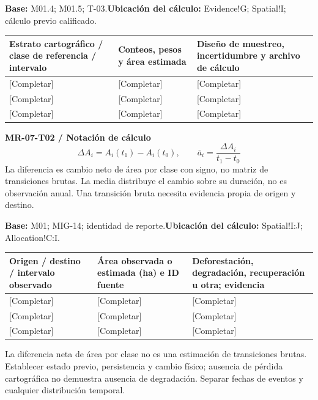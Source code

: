 \textbf{Base:} M01.4; M01.5; T-03.\quad\textbf{Ubicación del cálculo:} Evidence!G; Spatial!I; cálculo previo calificado.\par\endgroup
{\sffamily\fontsize{8.6}{10.7}\selectfont\begin{longtable}{@{}P{48mm}P{61mm}P{53mm}@{}}
\toprule
\textbf{Estrato cartográfico / clase de referencia / intervalo} & \textbf{Conteos, pesos y área estimada} & \textbf{Diseño de muestreo, incertidumbre y archivo de cálculo}\\\midrule\endhead
\rule{0pt}{8mm}[Completar] & [Completar] & [Completar]\\\hline
\rule{0pt}{8mm}[Completar] & [Completar] & [Completar]\\\hline
\rule{0pt}{8mm}[Completar] & [Completar] & [Completar]\\\hline
\end{longtable}}
\par\begingroup\sffamily\fontsize{8.4}{10.5}\selectfont\color{NEBGreen}
\textbf{MR-07-T02 / Notación de cálculo}\
{\fontsize{10}{12}\selectfont\[\Delta A_i=A_i(t_1)-A_i(t_0),\qquad \bar a_i=\frac{\Delta A_i}{t_1-t_0}\]}
La diferencia es cambio neto de área por clase con signo, no matriz de transiciones brutas. La media distribuye el cambio sobre su duración, no es observación anual. Una transición bruta necesita evidencia propia de origen y destino.\par
\textbf{Base:} M01; MIG-14; identidad de reporte.\quad\textbf{Ubicación del cálculo:} Spatial!I:J; Allocation!C:I.\par\endgroup
{\sffamily\fontsize{8.6}{10.7}\selectfont\begin{longtable}{@{}P{48mm}P{61mm}P{53mm}@{}}
\toprule
\textbf{Origen / destino / intervalo observado} & \textbf{Área observada o estimada (ha) e ID fuente} & \textbf{Deforestación, degradación, recuperación u otra; evidencia}\\\midrule\endhead
\rule{0pt}{8mm}[Completar] & [Completar] & [Completar]\\\hline
\rule{0pt}{8mm}[Completar] & [Completar] & [Completar]\\\hline
\rule{0pt}{8mm}[Completar] & [Completar] & [Completar]\\\hline
\end{longtable}}
La diferencia neta de área por clase no es una estimación de transiciones brutas. Establecer estado previo, persistencia y cambio físico; ausencia de pérdida cartográfica no demuestra ausencia de degradación. Separar fechas de eventos y cualquier distribución temporal.\par
